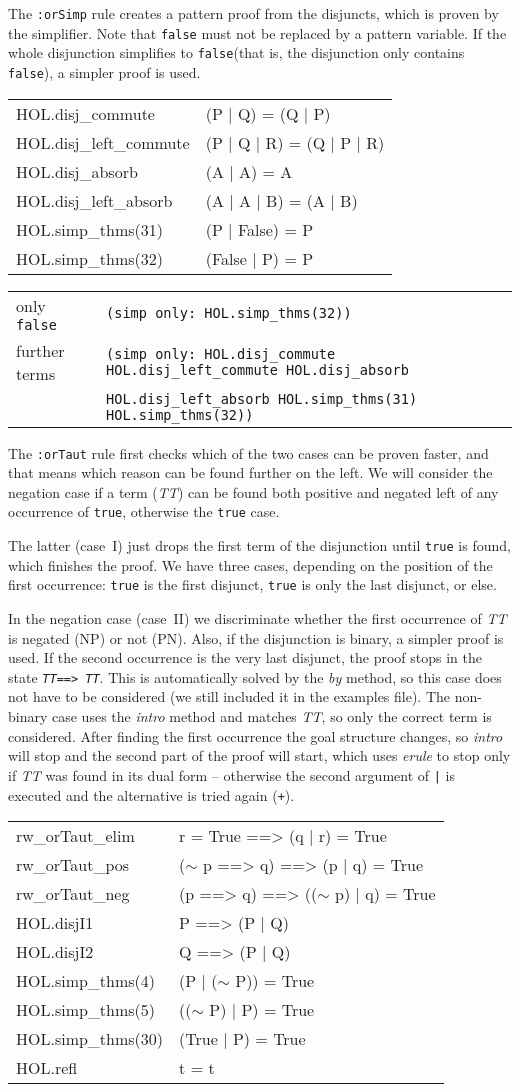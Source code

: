 \documentclass[10pt,a4paper]{article}
\newcommand{\ttt}{\texttt}
\newcommand{\negat}{\ensuremath{\sim}}
\newcommand{\nega}{\negat\xspace}
\newcommand{\TTx}{\emph{TT}}
\newcommand{\TT}{\TTx\xspace}
\newcommand{\true}{\ttt{true}\xspace}
\newcommand{\false}{\ttt{false}\xspace}
\newenvironment{pt}[1]{\begin{center}\begin{tt}\begin{tabular}{#1}\hline}{\end{tabular}\end{tt}\end{center}}
\newcommand{\pl}[1]{#1 \\[1mm]}
\newcommand{\pll}[1]{#1 \\\hline}
\newenvironment{rt}{\begin{center}\begin{tabular}{|l l|}\hline}{\end{tabular}\end{center}}
\newcommand{\rl}[2]{\rm{#1} & \tt{#2} \\[1mm]}
\newcommand{\rll}[2]{\rm{#1} & \tt{#2} \\\hline}
\def\ind{\quad}
\begin{document}
The \ttt{:orSimp} rule creates a pattern proof from the disjuncts, which is proven by the simplifier. Note that \false must not be replaced by a pattern variable. If the whole disjunction simplifies to \false (that is, the disjunction only contains \false), a simpler proof is used.
%
\begin{pt}{ll}
	\pl{HOL.disj\_commute & (P | Q) = (Q | P)}
	\pl{HOL.disj\_left\_commute & (P | Q | R) = (Q | P | R)}
	\pl{HOL.disj\_absorb & (A | A) = A}
	\pl{HOL.disj\_left\_absorb & (A | A | B) = (A | B)}
	\pl{HOL.simp\_thms(31) & (P | False) = P}
	\pll{HOL.simp\_thms(32) & (False | P) = P}
\end{pt}
%
\begin{rt}
	\rl{only \false}{(simp only:~HOL.simp\_thms(32))}
	\rl{further terms}{(simp only:~HOL.disj\_commute HOL.disj\_left\_commute HOL.disj\_absorb}
		\rll{}{\ind HOL.disj\_left\_absorb HOL.simp\_thms(31) HOL.simp\_thms(32))}
\end{rt}

The \ttt{:orTaut} rule first checks which of the two cases can be proven faster, and that means which reason can be found further on the left. We will consider the negation case if a term (\TT) can be found both positive and negated left of any occurrence of \true, otherwise the \true case.

The latter (case~I) just drops the first term of the disjunction until \true is found, which finishes the proof. We have three cases, depending on the position of the first occurrence: \true is the first disjunct, \true is only the last disjunct, or else.

In the negation case (case~II) we discriminate whether the first occurrence of \TT is negated (NP) or not (PN). Also, if the disjunction is binary, a simpler proof is used. If the second occurrence is the very last disjunct, the proof stops in the state \mbox{\ttt{\TT ==> \TT}}. This is automatically solved by the \emph{by} method, so this case does not have to be considered (we still included it in the examples file). The non-binary case uses the \emph{intro} method and matches \TT, so only the correct term is considered. After finding the first occurrence the goal structure changes, so \emph{intro} will stop and the second part of the proof will start, which uses \emph{erule} to stop only if \TT was found in its dual form -- otherwise the second argument of \ttt{|} is executed and the alternative is tried again (\ttt{+}).
%
\begin{pt}{ll}
	\pl{rw\_orTaut\_elim & r = True ==> (q | r) = True}
	\pl{rw\_orTaut\_pos & (\nega p ==> q) ==> (p | q) = True}
	\pl{rw\_orTaut\_neg & (p ==> q) ==> ((\nega p) | q) = True}
	\pl{HOL.disjI1 & P ==> (P | Q)}
	\pl{HOL.disjI2 & Q ==> (P | Q)}
	\pl{HOL.simp\_thms(4) & (P | (\nega P)) = True}
	\pl{HOL.simp\_thms(5) & ((\nega P) | P) = True}
	\pl{HOL.simp\_thms(30) & (True | P) = True}
	\pll{HOL.refl & t = t}
\end{pt}
\end{document}
